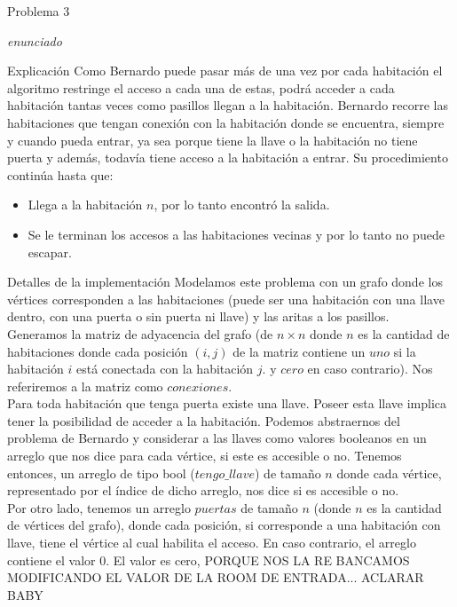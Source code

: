 \begin{section}{Problema 3}

	\textit{enunciado}

	\begin{subsection}{Explicación}
		Como Bernardo puede pasar más de una vez por cada habitación el algoritmo restringe el acceso a cada una de estas, podrá acceder a cada habitación tantas veces como pasillos llegan a la habitación.
		Bernardo recorre las habitaciones que tengan conexión con la habitación donde se encuentra, siempre y cuando pueda entrar, ya sea porque tiene la llave o la habitación no tiene puerta y además, todavía tiene acceso a la habitación a entrar. Su procedimiento continúa hasta que:
		\begin{itemize}
			\item Llega a la habitación $n$, por lo tanto encontró la salida.
			\item Se le terminan los accesos a las habitaciones vecinas y por lo tanto no puede escapar.
		\end{itemize}

	\end{subsection}

	\begin{subsection}{Detalles de la implementación}
		Modelamos este problema con un grafo donde los vértices corresponden a las habitaciones (puede ser una habitación con una llave dentro, con una puerta o sin puerta ni llave) y las aritas a los pasillos.\\	

		Generamos la matriz de adyacencia del grafo (de $n\times n$ donde $n$ es la cantidad de habitaciones donde cada posición $(i,j)$ de la matriz contiene un $uno$ si la habitación $i$ está conectada con la habitación $j$. y $cero$ en caso contrario). Nos referiremos a la matriz como $conexiones$.\\

		Para toda habitación que tenga puerta existe una llave. Poseer esta llave implica tener la posibilidad de acceder a la habitación. Podemos abstraernos del problema de Bernardo y considerar a las llaves como valores booleanos en un arreglo que nos dice para cada vértice, si este es accesible o no. Tenemos entonces, un arreglo de tipo bool ($tengo\_llave$) de tamaño $n$ donde cada vértice, representado por el índice de dicho arreglo, nos dice si es accesible o no.\\

		Por otro lado, tenemos un arreglo $puertas$ de tamaño $n$ (donde $n$ es la cantidad de vértices del grafo), donde cada posición, si corresponde a una habitación con llave, tiene el vértice al cual habilita el acceso. En caso contrario, el arreglo contiene el valor $0$. El valor es cero, PORQUE NOS LA RE BANCAMOS MODIFICANDO EL VALOR DE LA ROOM DE ENTRADA... ACLARAR BABY\\


\end{subsection}
\end{section}
